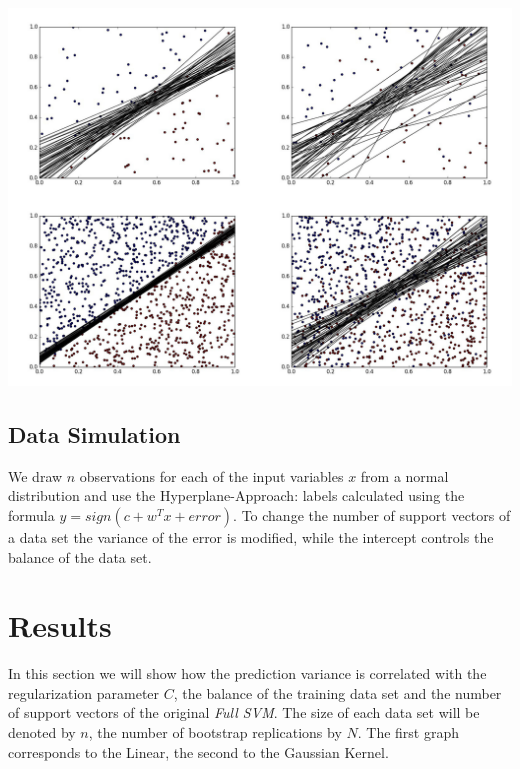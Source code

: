 \documentclass[a1,portrait]{a0poster}
\begin{document}
\begin{multicols}{3}
\begin{center}\vspace{1cm}
\includegraphics[width=1\linewidth]{abb/pic.jpg}
\label{fig3}
\end{center}\vspace{1cm}


\subsection*{Data Simulation}
We draw $n$ observations for each of the input variables $x$ from a normal distribution and use the Hyperplane-Approach: labels calculated using the formula $y= sign(c+ w^T x + error)$.
To change the number of support vectors of a data set the variance of the error is modified, while the intercept controls the balance of the data set.


\section*{Results}
In this section we will show how the prediction variance is correlated with the regularization parameter $C$, the balance of the training data set and the number of support vectors of the original \textit{Full SVM}. The size of each data set will be denoted by $n$, the number of bootstrap replications by $N$. The first graph corresponds to the Linear, the second to the Gaussian Kernel.


\end{multicols}
\end{document}
